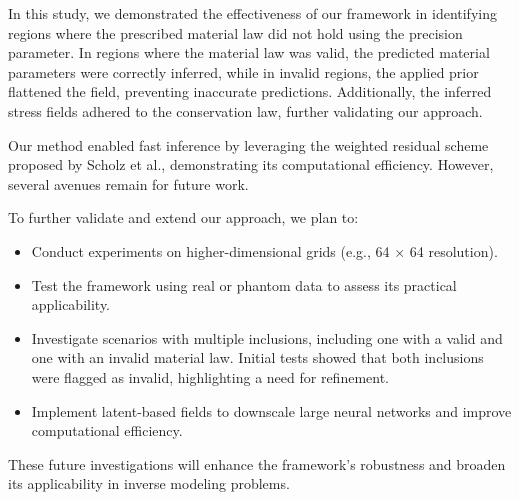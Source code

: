 In this study, we demonstrated the effectiveness of our framework in identifying regions where the prescribed material law did not hold using the precision parameter. In regions where the material law was valid, the predicted material parameters were correctly inferred, while in invalid regions, the applied prior flattened the field, preventing inaccurate predictions. Additionally, the inferred stress fields adhered to the conservation law, further validating our approach.

Our method enabled fast inference by leveraging the weighted residual scheme proposed by Scholz et al., demonstrating its computational efficiency. However, several avenues remain for future work.

To further validate and extend our approach, we plan to:
\begin{itemize}
    \item Conduct experiments on higher-dimensional grids (e.g., 64 × 64 resolution).
    \item Test the framework using real or phantom data to assess its practical applicability.
    \item Investigate scenarios with multiple inclusions, including one with a valid and one with an invalid material law. Initial tests showed that both inclusions were flagged as invalid, highlighting a need for refinement.
    \item Implement latent-based fields to downscale large neural networks and improve computational efficiency.
\end{itemize}

These future investigations will enhance the framework's robustness and broaden its applicability in inverse modeling problems.
